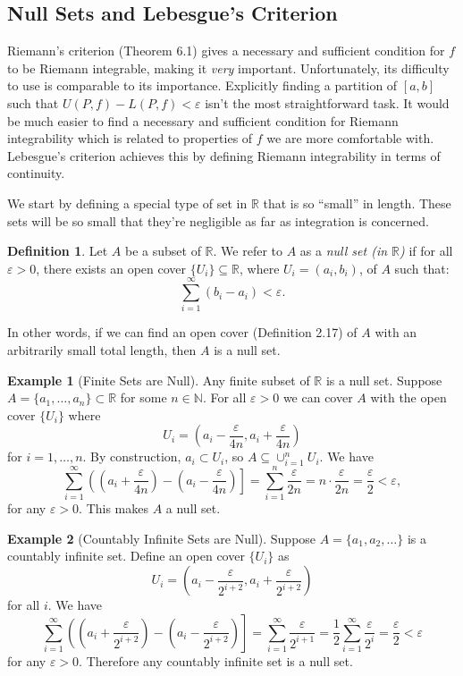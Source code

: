 \documentclass{article}
\newcommand{\N}{\mathbb{N}}
\newcommand{\R}{\mathbb{R}}
\theoremstyle{definition}
\newtheorem{definition}{Definition}[section]
\newtheorem{example}{Example}[section]
\begin{document}
	\subsection{Null Sets and Lebesgue's Criterion}
	Riemann's criterion (Theorem 6.1) gives a necessary and sufficient condition for $ f $ to be Riemann integrable, making it \textit{very} important. Unfortunately, its difficulty to use is comparable to its importance. Explicitly finding a partition of $ [a,b] $ such that $ U(P,f)-L(P,f)<\varepsilon $ isn't the most straightforward task. It would be much easier to find a necessary and sufficient condition for Riemann integrability which is related to properties of $ f $ we are more comfortable with. Lebesgue's criterion achieves this by defining Riemann integrability in terms of continuity. 
	
	We start by defining a special type of set in $ \R $ that is so ``small'' in length. These sets will be so small that they're negligible as far as integration is concerned. 
	\begin{definition}\label{def6.12}
		Let $ A $ be a subset of $ \R $. We refer to $ A $ as a \textit{\color{red}null set (in $ \R $)} if for all $ \varepsilon > 0 $, there exists an open cover $ \{U_i\}\subseteq \R $, where $ U_i=(a_i,b_i) $, of $ A $ such that:
		$$\sum_{i=1}^\infty (b_i-a_i) < \varepsilon .$$
	\end{definition}
	In other words, if we can find an open cover (Definition 2.17) of $ A $ with an arbitrarily small total length, then $ A $ is a null set. 
	\begin{example}[Finite Sets are Null]
		Any finite subset of $ \R $ is a null set. Suppose $ A = \{a_1,\ldots,a_n\} \subset \R $ for some $ n\in \N $. For all $ \varepsilon>0 $ we can cover $ A $ with the open cover $ \{U_i\} $ where $$ U_i = \left(a_i-\frac{\varepsilon}{4n}, a_i+\frac{\varepsilon}{4n}\right) $$ for $ i=1,\ldots, n $. By construction, $ a_i \subset U_i $, so $ A \subseteq \cup_{i=1}^n U_i $. We have 
		$$\sum_{i=1}^{\infty} \left(\left(a_i+\frac{\varepsilon}{4n}\right) - \left(a_i-\frac{\varepsilon}{4n}\right)\right] = \sum_{i=1}^{n}\frac{\varepsilon}{2n}=n\cdot \frac{\varepsilon}{2n}=\frac{\varepsilon}{2}<\varepsilon,$$ for any $ \varepsilon > 0 $. This makes $ A $ a null set. 
	\end{example}
	\begin{example}[Countably Infinite Sets are Null]
		Suppose $ A=\{a_1,a_2,\ldots\} $ is a countably infinite set. Define an open cover $ \{U_i\} $ as $$ U_i = \left(a_i-\frac{\varepsilon}{2^{i+2}}, a_i+\frac{\varepsilon}{2^{i+2}}\right)$$ for all $ i $.  
		We have	$$\sum_{i=1}^{\infty} \left(\left(a_i+\frac{\varepsilon}{2^{i+2}}\right) - \left(a_i-\frac{\varepsilon}{2^{i+2}}\right)\right] = \sum_{i=1}^{\infty} \frac{\varepsilon}{2^{i+1}} = \frac{1}{2}\sum_{i=1}^{\infty} \frac{\varepsilon}{2^{i}}=\frac{\varepsilon}{2}< \varepsilon$$ for any $ \varepsilon >0 $. Therefore any countably infinite set is a null set.
	\end{example}
\end{document}
